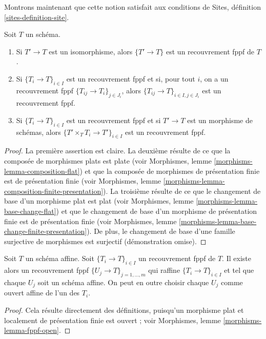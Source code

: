 \noindent
Montrons maintenant que cette notion satisfait aux conditions de
Sites, définition \ref{sites-definition-site}.

\begin{lemma}
\label{lemma-fppf}
Soit $T$ un schéma.
\begin{enumerate}
\item Si $T' \to T$ est un isomorphisme, alors $\{T' \to T\}$
est un recouvrement fppf de $T$.
\item Si $\{T_i \to T\}_{i\in I}$ est un recouvrement fppf et si, pour tout
$i$, on a un recouvrement fppf $\{T_{ij} \to T_i\}_{j\in J_i}$, alors
$\{T_{ij} \to T\}_{i \in I, j\in J_i}$ est un recouvrement fppf.
\item Si $\{T_i \to T\}_{i\in I}$ est un recouvrement fppf
et si $T' \to T$ est un morphisme de schémas, alors
$\{T' \times_T T_i \to T'\}_{i\in I}$ est un recouvrement fppf.
\end{enumerate}
\end{lemma}

\begin{proof}
La première assertion est claire.
La deuxième résulte de ce que la composée de morphismes plats est plate
(voir Morphismes, lemme \ref{morphisms-lemma-composition-flat})
et que la composée de morphismes de présentation finie est
de présentation finie
(voir Morphismes, lemme \ref{morphisms-lemma-composition-finite-presentation}).
La troisième résulte de ce que le changement de base d'un morphisme plat est plat
(voir Morphismes, lemme \ref{morphisms-lemma-base-change-flat})
et que le changement de base d'un morphisme de présentation finie est
de présentation finie
(voir Morphismes, lemme \ref{morphisms-lemma-base-change-finite-presentation}).
De plus, le changement de base d'une famille surjective de morphismes est surjectif
(démonstration omise).
\end{proof}

\begin{lemma}
\label{lemma-fppf-affine}
Soit $T$ un schéma affine.
Soit $\{T_i \to T\}_{i \in I}$ un recouvrement fppf de $T$.
Il existe alors un recouvrement fppf
$\{U_j \to T\}_{j = 1, \ldots, m}$ qui raffine
$\{T_i \to T\}_{i \in I}$ et tel que chaque $U_j$ soit un schéma
affine. On peut en outre choisir chaque $U_j$ comme ouvert affine
de l'un des $T_i$.
\end{lemma}

\begin{proof}
Cela résulte directement des définitions, puisqu'un
morphisme plat et localement de présentation finie est ouvert ;
voir Morphismes, lemme \ref{morphisms-lemma-fppf-open}.
\end{proof}

